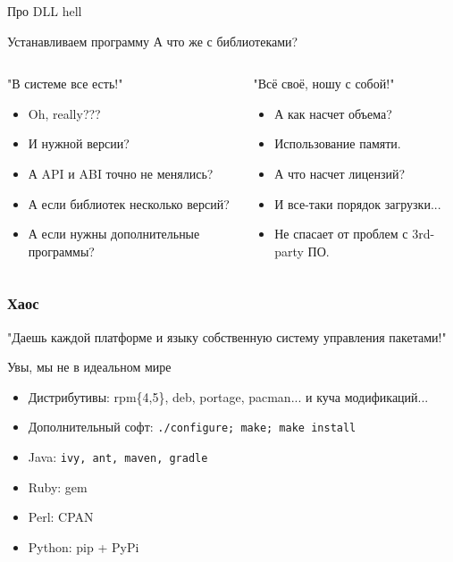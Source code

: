 \begin{frame}{Про DLL hell}

    \begin{block}{Устанавливаем программу}
	А что же с библиотеками?
	\end{block}

	\pause

   \begin{columns}
		\begin{block}{"В системе все есть!"}
		\begin{itemize}
			\item Oh, really???
			\item И нужной версии?
			\item А API и ABI точно не менялись?
			\item А если библиотек несколько версий?
			\item А если нужны дополнительные программы?
		\end{itemize}
		\end{block}
		\pause
		\begin{block}{"Всё своё, ношу с собой!"}
		\begin{itemize}
			\item А как насчет объема?
			\item Использование памяти.
			\item А что насчет лицензий?
			\item И все-таки порядок загрузки...
			\item Не спасает от проблем с 3rd-party ПО.
		\end{itemize}
		\end{block}
	\end{columns}
\end{frame}

\begin{frame}
	\frametitle{Хаос}

	\begin{center}
		"Даешь каждой платформе и языку собственную систему управления пакетами!"
	\end{center}

	\begin{block}{Увы, мы не в идеальном мире}
		\begin{itemize}
			\item Дистрибутивы: rpm\{4,5\}, deb, portage, pacman... и куча модификаций...
			\item Дополнительный софт: {\tt ./configure; make; make install}
			\item Java: {\tt ivy, ant, maven, gradle}
			\item Ruby: gem
			\item Perl: CPAN
			\item Python: pip + PyPi
		\end{itemize}
	\end{block}

\end{frame}

